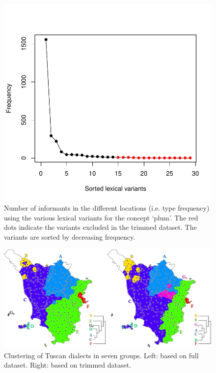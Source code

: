 \documentclass[output=paper]{LSP/langsci}
\begin{document}
\begin{figure}
\includegraphics[width=.75\textwidth]{illustrations/wiel_monte_fig1}
\caption{Number of informants in the different locations (i.e. type frequency) using the various lexical variants for the concept `plum'. The red dots indicate the variants excluded in the trimmed dataset. The variants are sorted by decreasing frequency.}
\label{fig:1}
\end{figure}

\begin{figure}
\includegraphics[width=\textwidth]{illustrations/wiel_monte_fig2}
\caption{Clustering of Tuscan dialects in seven groups. Left: based on full dataset. Right: based on trimmed dataset.}
\label{fig:2}
\end{figure}
\end{document}
